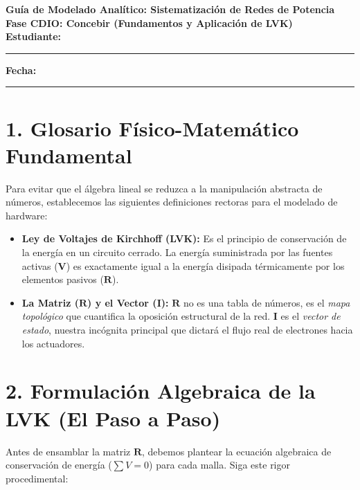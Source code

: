 \documentclass[11pt,a4paper]{article}
\begin{document}
\begin{center}
    {\Large \textbf{\textcolor{UCBblue}{Guía de Modelado Analítico: Sistematización de Redes de Potencia}}}\\
    \vspace{0.3cm}
    {\large \textbf{Fase CDIO: Concebir (Fundamentos y Aplicación de LVK)}}\\
    \vspace{0.5cm}
    \textbf{Estudiante:} \rule{8cm}{0.4pt} \quad \textbf{Fecha:} \rule{3cm}{0.4pt}
\end{center}

\vspace{0.3cm}

\section*{1. Glosario Físico-Matemático Fundamental}
Para evitar que el álgebra lineal se reduzca a la manipulación abstracta de números, establecemos las siguientes definiciones rectoras para el modelado de hardware:

\begin{itemize}
    \item \textbf{Ley de Voltajes de Kirchhoff (LVK):} Es el principio de conservación de la energía en un circuito cerrado. La energía suministrada por las fuentes activas ($\mathbf{V}$) es exactamente igual a la energía disipada térmicamente por los elementos pasivos ($\mathbf{R}$).
    \item \textbf{La Matriz ($\mathbf{R}$) y el Vector ($\mathbf{I}$):} $\mathbf{R}$ no es una tabla de números, es el \textit{mapa topológico} que cuantifica la oposición estructural de la red. $\mathbf{I}$ es el \textit{vector de estado}, nuestra incógnita principal que dictará el flujo real de electrones hacia los actuadores.
\end{itemize}

\section*{2. Formulación Algebraica de la LVK (El Paso a Paso)}
Antes de ensamblar la matriz $\mathbf{R}$, debemos plantear la ecuación algebraica de conservación de energía ($\sum V = 0$) para cada malla. Siga este rigor procedimental:
\end{document}
